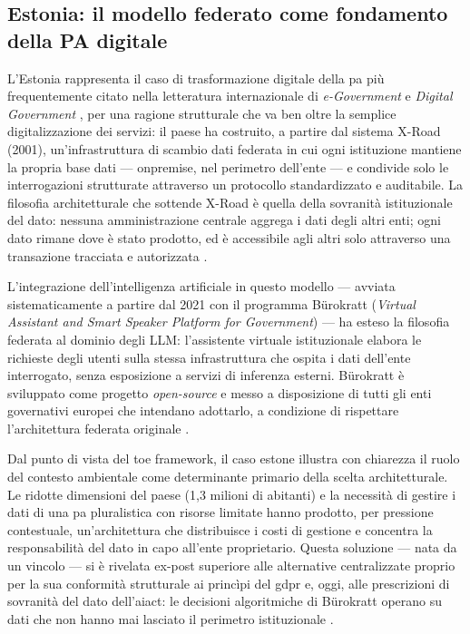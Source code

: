 \subsection{Estonia: il modello federato come fondamento della PA digitale}

L'Estonia rappresenta il caso di trasformazione digitale della \gls{pa} più frequentemente
citato nella letteratura internazionale di \textit{e-Government} e \textit{Digital
Government} \parencite{OECDGoverningAI2025}, per una ragione strutturale che va ben
oltre la semplice digitalizzazione dei servizi: il paese ha costruito, a partire dal
sistema X-Road (2001), un'infrastruttura di scambio dati federata in cui ogni
istituzione mantiene la propria base dati --- \gls{onpremise}, nel perimetro
dell'ente --- e condivide solo le interrogazioni strutturate attraverso un protocollo
standardizzato e auditabile. La filosofia architetturale che sottende X-Road è quella
della sovranità istituzionale del dato: nessuna amministrazione centrale
aggrega i dati degli altri enti; ogni dato rimane dove è stato prodotto, ed è
accessibile agli altri solo attraverso una transazione tracciata e autorizzata
\parencite{EUParl_TechSovereignty2025}.

L'integrazione dell'intelligenza artificiale in questo modello --- avviata
sistematicamente a partire dal 2021 con il programma Bürokratt
(\textit{Virtual Assistant and Smart Speaker Platform for Government}) ---
ha esteso la filosofia federata al dominio degli LLM: l'assistente virtuale
istituzionale elabora le richieste degli utenti sulla stessa infrastruttura che
ospita i dati dell'ente interrogato, senza esposizione a servizi di inferenza
esterni. Bürokratt è sviluppato come progetto \textit{open-source} e messo a
disposizione di tutti gli enti governativi europei che intendano adottarlo,
a condizione di rispettare l'architettura federata originale \parencite{OECDGoverningAI2025}.

Dal punto di vista del \gls{toe} framework, il caso estone illustra con chiarezza
il ruolo del contesto ambientale come determinante primario della scelta
architetturale. Le ridotte dimensioni del paese (1,3 milioni di abitanti) e la
necessità di gestire i dati di una \gls{pa} pluralistica con risorse limitate hanno
prodotto, per pressione contestuale, un'architettura che distribuisce i costi
di gestione e concentra la responsabilità del dato in capo all'ente proprietario.
Questa soluzione --- nata da un vincolo --- si è rivelata ex-post superiore alle
alternative centralizzate proprio per la sua conformità strutturale ai princìpi
del \gls{gdpr} e, oggi, alle prescrizioni di sovranità del dato dell'\gls{aiact}:
le decisioni algoritmiche di Bürokratt operano su dati che non hanno mai lasciato
il perimetro istituzionale \parencite{HohmannKollar2025}.

